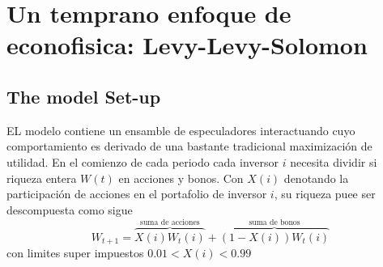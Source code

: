 \documentclass[12pt,a4paper]{article}
\begin{document}
\section*{Un temprano enfoque de econofisica: Levy-Levy-Solomon}
\subsection*{The model Set-up}
EL modelo contiene un ensamble de especuladores interactuando cuyo comportamiento es derivado de una bastante tradicional maximización de utilidad. En el comienzo de cada periodo cada inversor $i$ necesita dividir si riqueza entera $W(t)$ en acciones y bonos. Con $X(i)$ denotando la participación de acciones en el portafolio de inversor $i$, su riqueza puee ser descompuesta como sigue
\begin{equation}
W_{t+1} = \overbrace{X(i)W_{t}(i)}^{\textrm{suma de acciones}} + \overbrace{(1-X(i))W_t(i)}^{\textrm{suma de bonos}}
\end{equation}
con limites super impuestos $0.01<X(i)<0.99$\\
\end{document}
